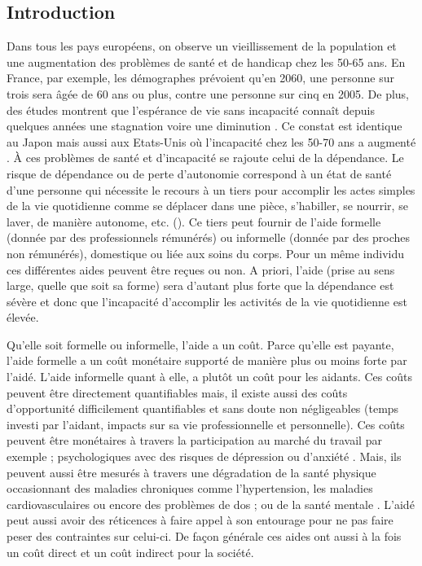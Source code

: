 \begin{Article}
\begin{refsection}[Bonnal]

							\section{Introduction}
Dans tous les pays européens, on observe un vieillissement de la population et une augmentation des problèmes de santé et de handicap chez les 50-65 ans. En France, par exemple, les démographes prévoient qu’en 2060, une personne sur trois sera âgée de 60 ans ou plus, contre une personne sur cinq en 2005. De plus, des études montrent que l’espérance de vie sans incapacité connaît depuis quelques années une stagnation \textcite{MOISY2018} voire une diminution \parencite{ROBINE2017}. Ce constat est identique au Japon \parencite{HAN2014,SHIMADA2013} mais aussi aux Etats-Unis où l’incapacité chez les 50-70 ans a augmenté \parencite{MARTIN2009,REYNOLDS2010,SEEMAN2010}. À ces problèmes de santé et d’incapacité se rajoute celui de la dépendance. Le risque de dépendance ou de perte d’autonomie correspond à un état de santé d’une personne qui nécessite le recours à un tiers pour accomplir les actes simples de la vie quotidienne comme se déplacer dans une pièce, s'habiller, se nourrir, se laver, de manière autonome, etc. (\parencite{DUPUY2016}). Ce tiers peut fournir de l’aide formelle (donnée par des professionnels rémunérés) ou informelle (donnée par des proches non rémunérés), domestique ou liée aux soins du corps. Pour un même individu ces différentes aides peuvent être reçues ou non. A priori, l’aide (prise au sens large, quelle que soit sa forme) sera d’autant plus forte que la dépendance est sévère et donc que l’incapacité d’accomplir les activités de la vie quotidienne est élevée.

Qu’elle soit formelle ou informelle, l'aide a un coût. Parce qu'elle est payante, l’aide formelle a un coût monétaire supporté de manière plus ou moins forte par l’aidé. L’aide informelle quant à elle, a plutôt un coût pour les aidants. Ces coûts peuvent être directement quantifiables mais, il existe aussi des coûts d’opportunité difficilement quantifiables et sans doute non négligeables (temps investi par l'aidant, impacts sur sa vie professionnelle et personnelle). Ces coûts peuvent être monétaires à travers la participation au marché du travail par exemple \parencite{FONTAINE2010,SOULLIER2011,VANHOUTVEN2013} ; psychologiques avec des risques de dépression ou d’anxiété \parencite{MAJEROVITZ1995}. Mais, ils peuvent aussi être mesurés à travers une dégradation de la santé physique occasionnant des maladies chroniques comme l’hypertension, les maladies cardiovasculaires ou encore des problèmes de dos \parencite{GRANT2002,MAUSBACH2007} ; ou de la santé mentale \parencite{COLOMBO2011,LEIGH2010}. L'aidé peut aussi avoir des réticences à faire appel à son entourage pour ne pas faire peser des contraintes sur celui-ci. De façon générale ces aides ont aussi à la fois un coût direct et un coût indirect pour la société.


\end{refsection}
\end{Article}
